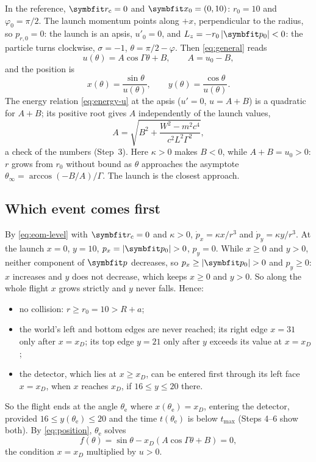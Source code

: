 \documentclass{leveldoc}
\begin{document}
In the reference, $\vect{r}_\mathrm{c} = 0$ and $\vect{x}_0 = (0, 10)$: $r_0 = 10$ and
$\varphi_0 = \pi/2$. The launch momentum points along $+x$, perpendicular to the radius, so
$p_{r,0} = 0$: the launch is an apsis, $u'_0 = 0$, and $L_z = -r_0\abs{\vect{p}_0} < 0$: the
particle turns clockwise, $\sigma = -1$, $\theta = \pi/2 - \varphi$. Then \eqref{eq:general}
reads
\begin{equation}\label{eq:reference}
  u(\theta) = A\cos\Gamma\theta + B, \qquad A = u_0 - B,
\end{equation}
and the position is
\begin{equation}\label{eq:position}
  x(\theta) = \frac{\sin\theta}{u(\theta)}, \qquad y(\theta) = \frac{\cos\theta}{u(\theta)}.
\end{equation}
The energy relation \eqref{eq:energy-u} at the apsis ($u' = 0$, $u = A + B$) is a quadratic
for $A + B$; its positive root gives $A$ independently of the launch values,
\begin{equation}\label{eq:amplitude}
  A = \sqrt{B^2 + \frac{W^2 - m^2c^4}{c^2L^2\Gamma^2}},
\end{equation}
a check of the numbers (Step~3). Here $\kappa > 0$ makes $B < 0$, while $A + B = u_0 > 0$: $r$ grows
from $r_0$ without bound as $\theta$ approaches the asymptote
$\theta_\infty = \arccos(-B/A)/\Gamma$. The launch is the closest approach.

\subsection{Which event comes first}\label{sec:first-event}

By \eqref{eq:eom-level} with $\vect{r}_\mathrm{c} = 0$ and $\kappa > 0$,
$\dot p_x = \kappa x/r^3$ and $\dot p_y = \kappa y/r^3$. At the launch $x = 0$, $y = 10$,
$p_x = \abs{\vect{p}_0} > 0$, $p_y = 0$. While $x \ge 0$ and $y > 0$, neither component of
$\vect{p}$ decreases, so $p_x \ge \abs{\vect{p}_0} > 0$ and $p_y \ge 0$: $x$ increases and $y$
does not decrease, which keeps $x \ge 0$ and $y > 0$. So along the whole flight $x$ grows
strictly and $y$ never falls. Hence:
\begin{itemize}
  \item no collision: $r \ge r_0 = 10 > R + a$;
  \item the world's left and bottom edges are never reached; its right edge $x = 31$ only
    after $x = x_D$; its top edge $y = 21$ only after $y$ exceeds its value at $x = x_D$;
  \item the detector, which lies at $x \ge x_D$, can be entered first through its left face
    $x = x_D$, when $x$ reaches $x_D$, if $16 \le y \le 20$ there.
\end{itemize}
So the flight ends at the angle $\theta_\mathrm{e}$ where $x(\theta_\mathrm{e}) = x_D$, entering
the detector, provided $16 \le y(\theta_\mathrm{e}) \le 20$ and the time $t(\theta_\mathrm{e})$
is below $t_{\max}$ (Steps 4--6 show both). By \eqref{eq:position}, $\theta_\mathrm{e}$ solves
\begin{equation}\label{eq:crossing}
  f(\theta) = \sin\theta - x_D\left(A\cos\Gamma\theta + B\right) = 0,
\end{equation}
the condition $x = x_D$ multiplied by $u > 0$.
\end{document}
